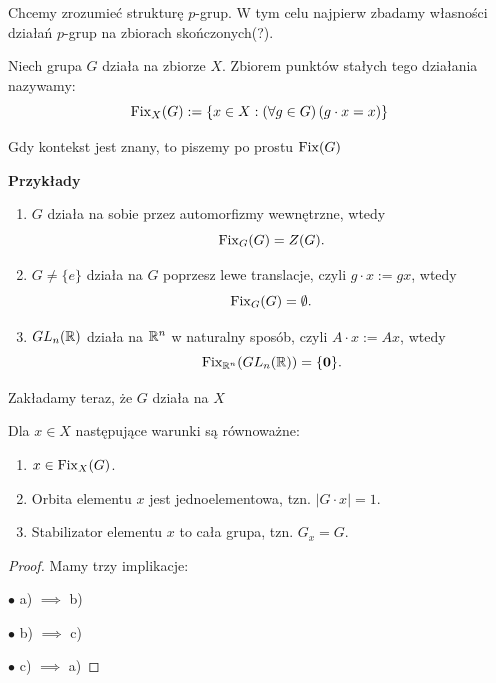 Chcemy zrozumieć strukturę $p$-grup. W tym celu najpierw zbadamy własności działań $p$-grup na zbiorach skończonych(?).

\begin{definition}
    Niech grupa $G$ działa na zbiorze $X$. Zbiorem punktów stałych tego działania nazywamy:
    \[
    \operatorname{Fix}_{X}(G) := \{x \in X: \left(\forall g\in G \right)\left( g\cdot x = x\right)\} 
    \] 
\end{definition} 

Gdy kontekst jest znany, to piszemy po prostu $\operatorname{Fix}(G) $

\noindent \textbf{Przykłady} 
	
\begin{enumerate}[label=\arabic*.]
	\item $G$ działa na sobie przez automorfizmy wewnętrzne, wtedy 
		 \[
		\operatorname{Fix}_{G}(G) = Z(G)
		.\] 
	\item $G\neq \{e\}$ działa na $G$ poprzesz lewe translacje, czyli $g\cdot x:= gx$, wtedy
		 \[
		\operatorname{Fix}_{G}(G) = \emptyset
		.\] 
	\item $GL_{n}(\mathbb{R})$ działa na $\mathbb{R}^{n}$ w naturalny sposób, czyli $A\cdot x:= Ax$, wtedy
		\[
			\operatorname{Fix}_{\mathbb{R}^{n}}(GL_{n}(\mathbb{R})) = \{\mathbf{0}\} 
		.\] 
\end{enumerate}

\begin{context}
	Zakładamy teraz, że $G$ działa na $X$
\end{context}

\begin{theorem}
    Dla $x \in X$ następujące warunki są równoważne:
    \begin{enumerate}[label=\alph*)]
        \item $x\in \operatorname{Fix}_{X}(G)$.
        \item Orbita elementu $x$ jest jednoelementowa, tzn. $|G\cdot x| = 1$.
        \item Stabilizator elementu $x$ to cała grupa, tzn. $G_x = G$.
    \end{enumerate}
\end{theorem}
\begin{proof}
	Mamy trzy implikacje:

	\noindent$\bullet$ a)  $\implies$ b)

	\noindent$\bullet$ b) $\implies$ c)

	\noindent$\bullet$ c) $\implies$ a)

\end{proof} 

